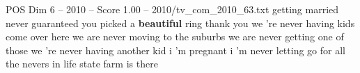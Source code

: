 \begin{textsample}{POS Dim 6 – 2010 – Score 1.00 – 2010/tv\_com\_2010\_63.txt}  \label{ex:f6_pos_062}
getting married never guaranteed you picked a \textbf{beautiful} ring thank you we 're never having kids come over here we are never moving to the suburbs we are never getting one of those we 're never having another kid i 'm pregnant i 'm never letting go for all the nevers in life state farm is there

\end{textsample}
